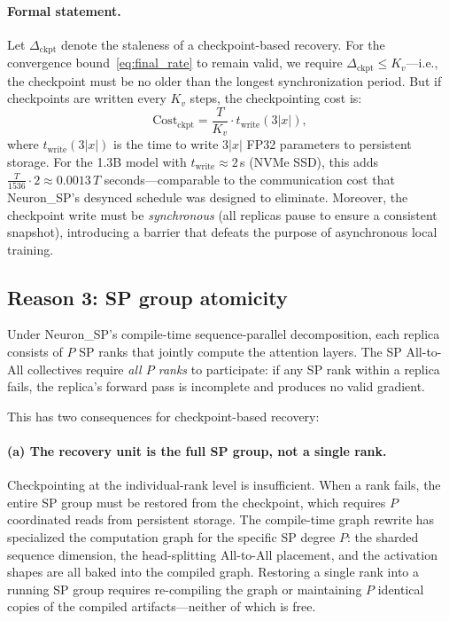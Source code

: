 \documentclass{article}
\begin{document}
\paragraph{Formal statement.}
Let $\Delta_{\text{ckpt}}$ denote the staleness of a checkpoint-based
recovery. For the convergence bound~\eqref{eq:final_rate} to remain valid,
we require $\Delta_{\text{ckpt}} \leq K_v$---i.e., the checkpoint must be
no older than the longest synchronization period. But if checkpoints are
written every $K_v$ steps, the checkpointing cost is:
\begin{equation}
\text{Cost}_{\text{ckpt}} = \frac{T}{K_v} \cdot t_{\text{write}}(3|x|),
\label{eq:ckpt_cost}
\end{equation}
where $t_{\text{write}}(3|x|)$ is the time to write $3|x|$ FP32
parameters to persistent storage. For the 1.3B model with
$t_{\text{write}} \approx 2$\,s (NVMe SSD), this adds
$\frac{T}{1536} \cdot 2 \approx 0.0013\,T$ seconds---comparable to the
communication cost that Neuron\_SP's desynced schedule was designed to
eliminate. Moreover, the checkpoint write must be \emph{synchronous}
(all replicas pause to ensure a consistent snapshot), introducing a
barrier that defeats the purpose of asynchronous local training.

\subsection{Reason 3: SP group atomicity}
\label{sec:checkpoint_sp}

Under Neuron\_SP's compile-time sequence-parallel decomposition, each
replica consists of $P$ SP ranks that jointly compute the attention
layers. The SP All-to-All collectives require \emph{all $P$ ranks} to
participate: if any SP rank within a replica fails, the replica's
forward pass is incomplete and produces no valid gradient.

This has two consequences for checkpoint-based recovery:

\paragraph{(a) The recovery unit is the full SP group, not a single rank.}
Checkpointing at the individual-rank level is insufficient. When a rank
fails, the entire SP group must be restored from the checkpoint, which
requires $P$ coordinated reads from persistent storage. The compile-time
graph rewrite has specialized the computation graph for the specific
SP degree $P$: the sharded sequence dimension, the head-splitting
All-to-All placement, and the activation shapes are all baked into the
compiled graph. Restoring a single rank into a running SP group requires
re-compiling the graph or maintaining $P$ identical copies of the
compiled artifacts---neither of which is free.
\end{document}
